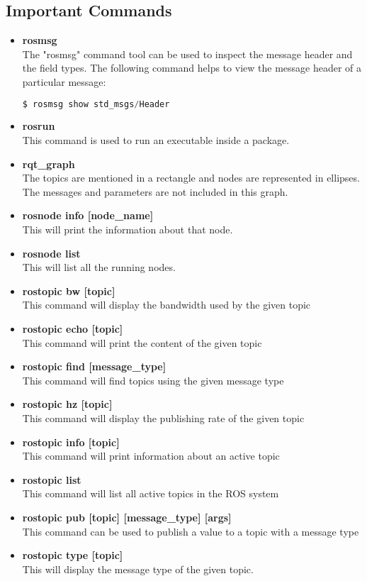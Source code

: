 \documentclass[•]{article}
\begin{document}
\begin{itemize}
\end{itemize}

\subsection{Important Commands}
\begin{itemize}
\item \textbf{rosmsg}\\
The "rosmsg" command tool can be used to inspect the message header and the field types. The following command helps to view the message header of a particular message:\\
\begin{lstlisting}[language=Python]
$ rosmsg show std_msgs/Header
\end{lstlisting}

\item \textbf{rosrun}\\
This command is used to run an executable inside a package.
\item \textbf{rqt\_graph}\\
The topics are mentioned in a rectangle and nodes are represented in ellipses. The messages and parameters are not included in this graph.
\item \textbf{rosnode info [node\_name]}\\
This will print the information about that node.
\item \textbf{rosnode list}\\
This will list all the running nodes.

\item \textbf{rostopic bw [topic]}\\
This command will display the bandwidth used by the given topic
\item \textbf{rostopic echo [topic]}\\
This command will print the content of the given topic
\item \textbf{rostopic find [message\_type]}\\
This command will find topics using the given message type
\item \textbf{rostopic hz [topic]}\\
This command will display the publishing rate of the given topic
\item \textbf{rostopic info [topic]}\\
This command will print information about an active topic
\item \textbf{rostopic list}\\
This command will list all active topics in the ROS system
\item \textbf{rostopic pub [topic] [message\_type] [args]}\\
This command can be used to publish a value to a topic with a message type
\item \textbf{rostopic type [topic]}\\
This will display the message type of the given topic.


\end{itemize}
\end{document}
